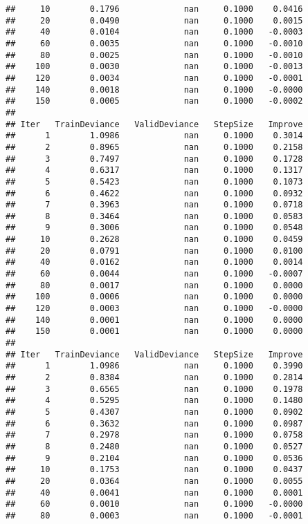 \documentclass[
]{article}
\begin{document}
\begin{verbatim}
##     10        0.1796             nan     0.1000    0.0416
##     20        0.0490             nan     0.1000    0.0015
##     40        0.0104             nan     0.1000   -0.0003
##     60        0.0035             nan     0.1000   -0.0010
##     80        0.0025             nan     0.1000   -0.0010
##    100        0.0030             nan     0.1000   -0.0013
##    120        0.0034             nan     0.1000   -0.0001
##    140        0.0018             nan     0.1000   -0.0000
##    150        0.0005             nan     0.1000   -0.0002
## 
## Iter   TrainDeviance   ValidDeviance   StepSize   Improve
##      1        1.0986             nan     0.1000    0.3014
##      2        0.8965             nan     0.1000    0.2158
##      3        0.7497             nan     0.1000    0.1728
##      4        0.6317             nan     0.1000    0.1317
##      5        0.5423             nan     0.1000    0.1073
##      6        0.4622             nan     0.1000    0.0932
##      7        0.3963             nan     0.1000    0.0718
##      8        0.3464             nan     0.1000    0.0583
##      9        0.3006             nan     0.1000    0.0548
##     10        0.2628             nan     0.1000    0.0459
##     20        0.0791             nan     0.1000    0.0100
##     40        0.0162             nan     0.1000    0.0014
##     60        0.0044             nan     0.1000   -0.0007
##     80        0.0017             nan     0.1000    0.0000
##    100        0.0006             nan     0.1000    0.0000
##    120        0.0003             nan     0.1000   -0.0000
##    140        0.0001             nan     0.1000    0.0000
##    150        0.0001             nan     0.1000    0.0000
## 
## Iter   TrainDeviance   ValidDeviance   StepSize   Improve
##      1        1.0986             nan     0.1000    0.3990
##      2        0.8384             nan     0.1000    0.2814
##      3        0.6565             nan     0.1000    0.1978
##      4        0.5295             nan     0.1000    0.1480
##      5        0.4307             nan     0.1000    0.0902
##      6        0.3632             nan     0.1000    0.0987
##      7        0.2978             nan     0.1000    0.0758
##      8        0.2480             nan     0.1000    0.0527
##      9        0.2104             nan     0.1000    0.0536
##     10        0.1753             nan     0.1000    0.0437
##     20        0.0364             nan     0.1000    0.0055
##     40        0.0041             nan     0.1000    0.0001
##     60        0.0010             nan     0.1000   -0.0000
##     80        0.0003             nan     0.1000   -0.0001

\end{verbatim}
\end{document}

